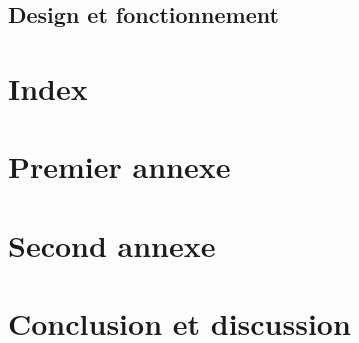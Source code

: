 \documentclass[a4paper]{article}
\begin{document}
\subsection{Design et fonctionnement}
\section{Index}

\appendix

\section{Premier annexe}
\section{Second annexe}

\section{Conclusion et discussion}

\tableofcontents    %
\listoffigures        %
\listoftables        %

\end{document}
